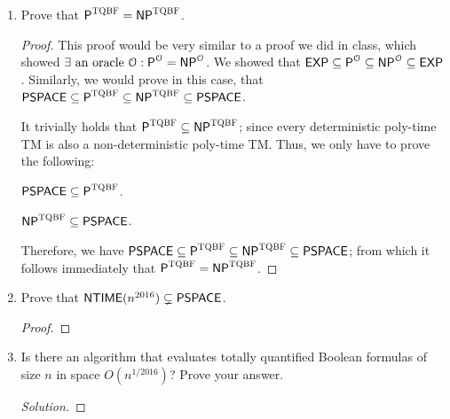 \documentclass[usletter]{article}
\newcommand {\langset}[1]      {\ensuremath{\mathcal{#1}}}
\newcommand {\family}[1]       {\ensuremath{\textnormal{\textsf{#1}}}}
\newcommand {\namedlangset}[1] {\ensuremath{\textnormal{\textsc{#1}}}}
\begin{document}
\begin{enumerate}
  \item Prove that
        $\family{P}^\namedlangset{TQBF} = \family{NP}^\namedlangset{TQBF}$.
  \begin{proof}
    This proof would be very similar to a proof we did in class, which showed
    $\exists \textnormal{ an oracle } \langset{O}:
      \family{P}^\langset{O} = \family{NP}^\langset{O}$.
    We showed that $\family{EXP} \subseteq \family{P}^\langset{O}
                                 \subseteq \family{NP}^\langset{O}
                                 \subseteq \family{EXP}$.
    Similarly, we would prove in this case, that
    $\family{PSPACE} \subseteq \family{P}^\namedlangset{TQBF}
                     \subseteq \family{NP}^\namedlangset{TQBF}
                     \subseteq \family{PSPACE}$.

    It trivially holds that
    $\family{P}^\namedlangset{TQBF} \subseteq \family{NP}^\namedlangset{TQBF}$;
    since every deterministic poly-time TM is also a non-deterministic poly-time
    TM. Thus, we only have to prove the following:

    \begin{claim}
      $ \family{PSPACE} \subseteq \family{P}^\namedlangset{TQBF} $.
    \end{claim}

    \begin{claim}
      $ \family{NP}^\namedlangset{TQBF} \subseteq \family{PSPACE} $.
    \end{claim}

    Therefore, we have
    $\family{PSPACE} \subseteq \family{P}^\namedlangset{TQBF}
                     \subseteq \family{NP}^\namedlangset{TQBF}
                     \subseteq \family{PSPACE}$;
    from which it follows immediately that
    $\family{P}^\namedlangset{TQBF} = \family{NP}^\namedlangset{TQBF}$.
  \end{proof}

  \item Prove that $\family{NTIME}(n^{2016}) \subsetneq \family{PSPACE}$.
  \begin{proof}
  \end{proof}

  \item Is there an algorithm that evaluates totally quantified Boolean formulas
        of size $n$ in space $O(n^{1/2016})$? Prove your answer.
  \begin{proof}[Solution]
  \end{proof}
\end{enumerate}



\end{document}
